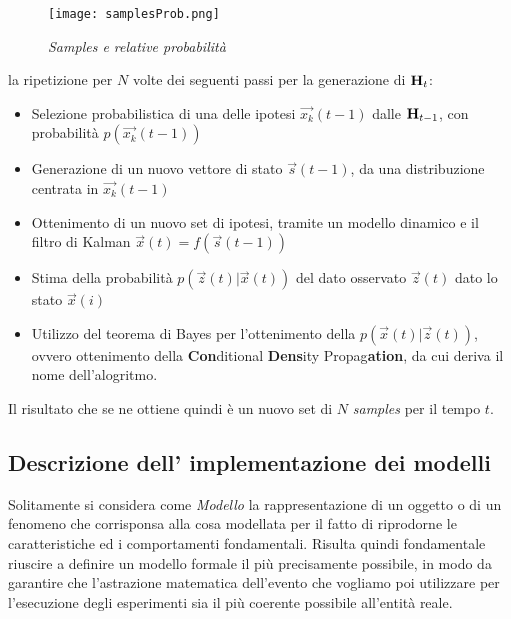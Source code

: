 \begin{figure}[hb]
\centering
	\texttt{[image: samplesProb.png]}
\caption{\textit{Samples e relative probabilità}\label{fig:samplesProb}}
\end{figure}

la ripetizione per $N$ volte dei seguenti passi per la generazione di $\mbox{{\bfseries H}}_t$:
\begin{itemize}
\item Selezione probabilistica di una delle ipotesi $\overrightarrow{x_k}(t-1)$ dalle $\mbox{{\bfseries H}}_{t-1}$, con probabilità $p(\overrightarrow{x_k}(t-1))$
\item Generazione di un nuovo vettore di stato $\overrightarrow{s}(t-1)$, da una distribuzione centrata in   $\overrightarrow{x_k}(t-1)$
\item Ottenimento di un nuovo set di ipotesi, tramite un modello dinamico e il filtro di Kalman $\overrightarrow{x}(t)=f(\overrightarrow{s}(t-1))$
\item Stima della probabilità $p(\overrightarrow{z}(t)|\overrightarrow{x}(t))$ del dato osservato $\overrightarrow{z}(t)$ dato lo stato $\overrightarrow{x}(i)$
\item Utilizzo del teorema di Bayes per l'ottenimento della $p(\overrightarrow{x}(t)|\overrightarrow{z}(t))$, ovvero ottenimento della \textbf{Con}ditional \textbf{Dens}ity Propag\textbf{ation}, da cui deriva il nome dell'alogritmo.
\end{itemize}

Il risultato che se ne ottiene quindi è un nuovo set di $N$ \textit{samples} per il tempo $t$.
\subsection{Descrizione dell' implementazione dei modelli} \label{sec:modelli}
Solitamente si considera come \textit{Modello} la rappresentazione di un oggetto o di un fenomeno che corrisponsa alla cosa modellata per il fatto  di riprodorne le caratteristiche ed i comportamenti fondamentali. 
Risulta quindi fondamentale riuscire a definire un modello formale il più precisamente possibile, in modo da garantire che l'astrazione matematica dell'evento che vogliamo poi utilizzare per l'esecuzione degli esperimenti sia il più coerente possibile all'entità reale. 

